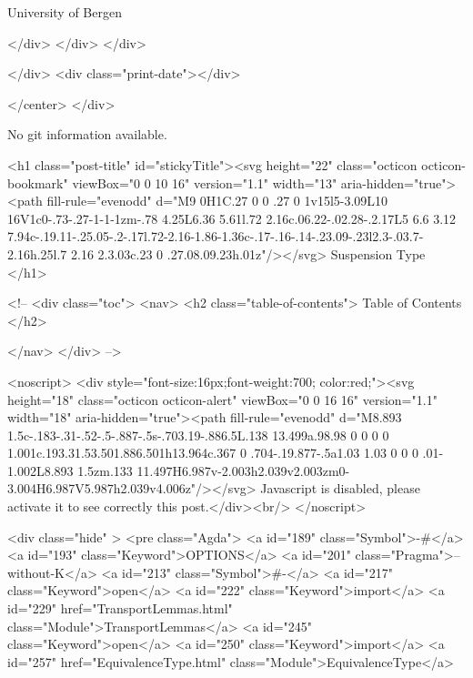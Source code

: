                   University of Bergen
                
                </div>
            </div>
          </div>
          
          
        </div>
        <div class="print-date"></div>
        
        
    </center>
  </div>

  
  No git information available.
  
  <h1 class="post-title" id="stickyTitle"><svg height="22" class="octicon octicon-bookmark" viewBox="0 0 10 16" version="1.1" width="13" aria-hidden="true"><path fill-rule="evenodd" d="M9 0H1C.27 0 0 .27 0 1v15l5-3.09L10 16V1c0-.73-.27-1-1-1zm-.78 4.25L6.36 5.61l.72 2.16c.06.22-.02.28-.2.17L5 6.6 3.12 7.94c-.19.11-.25.05-.2-.17l.72-2.16-1.86-1.36c-.17-.16-.14-.23.09-.23l2.3-.03.7-2.16h.25l.7 2.16 2.3.03c.23 0 .27.08.09.23h.01z"/></svg> Suspension Type
  </h1>

  <!-- 
  <div class="toc">
    <nav>
    <h2 class="table-of-contents"> Table of Contents </h2>
      

    </nav>
  </div>
   -->

  <noscript>
  <div style="font-size:16px;font-weight:700; color:red;"><svg height="18" class="octicon octicon-alert" viewBox="0 0 16 16" version="1.1" width="18" aria-hidden="true"><path fill-rule="evenodd" d="M8.893 1.5c-.183-.31-.52-.5-.887-.5s-.703.19-.886.5L.138 13.499a.98.98 0 0 0 0 1.001c.193.31.53.501.886.501h13.964c.367 0 .704-.19.877-.5a1.03 1.03 0 0 0 .01-1.002L8.893 1.5zm.133 11.497H6.987v-2.003h2.039v2.003zm0-3.004H6.987V5.987h2.039v4.006z"/></svg> Javascript is disabled, please activate it to see correctly this post.</div><br/>
  </noscript>

  <div class="hide" >
<pre class="Agda">
<a id="189" class="Symbol">{-#</a> <a id="193" class="Keyword">OPTIONS</a> <a id="201" class="Pragma">--without-K</a> <a id="213" class="Symbol">#-}</a>
<a id="217" class="Keyword">open</a> <a id="222" class="Keyword">import</a> <a id="229" href="TransportLemmas.html" class="Module">TransportLemmas</a>
<a id="245" class="Keyword">open</a> <a id="250" class="Keyword">import</a> <a id="257" href="EquivalenceType.html" class="Module">EquivalenceType</a>


